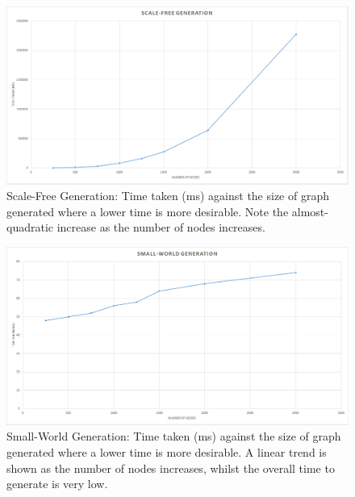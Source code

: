 \documentclass[]{report}
\begin{document}
\begin{figure}
\label{img:SF-gen}
\begin{center}
\includegraphics[scale=0.4]{scale-free-gen.png}
\end{center}
\caption{Scale-Free Generation: Time taken (ms) against the size of graph generated where a lower time is more desirable. Note the almost-quadratic increase as the number of nodes increases.}
\end{figure}
\begin{figure}
\label{img:SW-gen}
\begin{center}
\includegraphics[scale=0.4]{small-world-gen.png}
\end{center}
\caption{Small-World Generation: Time taken (ms) against the size of graph generated where a lower time is more desirable. A linear trend is shown as the number of nodes increases, whilst the overall time to generate is very low.}
\end{figure}
\end{document}
